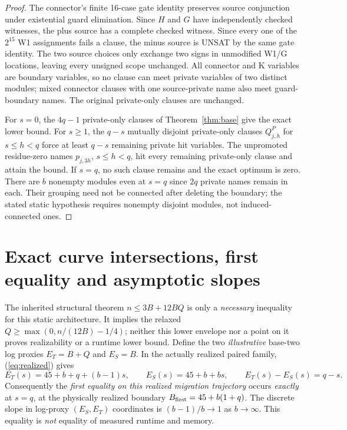 \documentclass[10pt]{article}
\begin{document}
\begin{proof}
The connector's finite 16-case gate identity preserves source conjunction under existential guard elimination. Since $H$ and $G$ have independently checked witnesses, the plus source has a complete checked witness. Since every one of the $2^{15}$ W1 assignments fails a clause, the minus source is UNSAT by the same gate identity. The two source choices only exchange two signs in unmodified W1/G locations, leaving every unsigned scope unchanged. All connector and K variables are boundary variables, so no clause can meet private variables of two distinct modules; mixed connector clauses with one source-private name also meet guard-boundary names. The original private-only clauses are unchanged.

For $s=0$, the $4q-1$ private-only clauses of Theorem~\ref{thm:base} give the exact lower bound. For $s\ge1$, the $q-s$ mutually disjoint private-only clauses $Q^P_{j,h}$ for $s\le h<q$ force at least $q-s$ remaining private hit variables. The unpromoted residue-zero names $p_{j,3h}$, $s\le h<q$, hit every remaining private-only clause and attain the bound. If $s=q$, no such clause remains and the exact optimum is zero. There are $b$ nonempty modules even at $s=q$ since $2q$ private names remain in each. Their grouping need not be connected after deleting the boundary; the stated static hypothesis requires nonempty disjoint modules, not induced-connected ones.
\end{proof}

\section{Exact curve intersections, first equality and asymptotic slopes}
\noindent The inherited structural theorem \(n\le3B+12BQ\) is only a \emph{necessary} inequality for this static architecture. It implies the relaxed \(Q\ge\max(0,n/(12B)-1/4)\); neither this lower envelope nor a point on it proves realizability or a runtime lower bound. Define the two \emph{illustrative} base-two log proxies \(E_T=B+Q\) and \(E_S=B\). In the actually realized paired family, (\ref{eq:realized}) gives
\begin{equation}\label{eq:lines}
 E_T(s)=45+b+q+(b-1)s,\qquad E_S(s)=45+b+bs,\qquad E_T(s)-E_S(s)=q-s.
\end{equation}
Consequently the \emph{first equality on this realized migration trajectory} occurs \emph{exactly} at $s=q$, at the physically realized boundary $B_{\rm first}=45+b(1+q)$. The discrete slope in log-proxy $(E_S,E_T)$ coordinates is $(b-1)/b\to1$ as $b\to\infty$. This equality is \emph{not} equality of measured runtime and memory.
\end{document}
